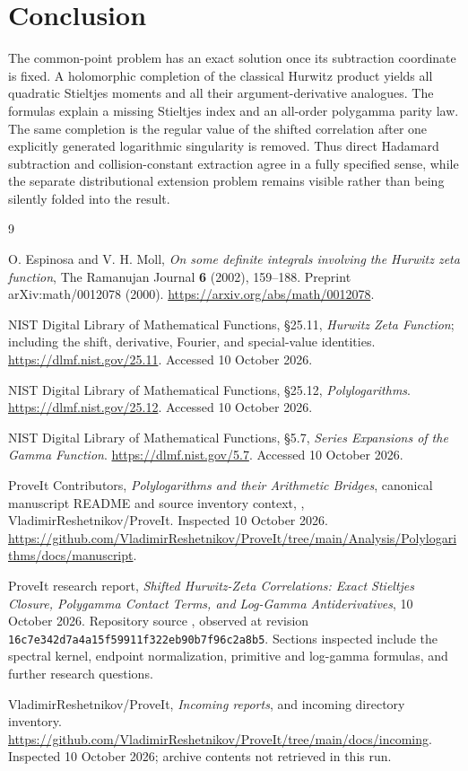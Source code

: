 \documentclass[11pt,a4paper]{article}
\numberwithin{equation}{section}
\theoremstyle{definition}
\newcommand{\cscpin}{\texttt{16c7e342d7a4a15f59911f322eb90b7f96c2a8b5}}
\begin{document}
\section*{Conclusion}
The common-point problem has an exact solution once its subtraction coordinate is fixed. A holomorphic completion of the classical Hurwitz product yields all quadratic Stieltjes moments and all their argument-derivative analogues. The formulas explain a missing Stieltjes index and an all-order polygamma parity law. The same completion is the regular value of the shifted correlation after one explicitly generated logarithmic singularity is removed. Thus direct Hadamard subtraction and collision-constant extraction agree in a fully specified sense, while the separate distributional extension problem remains visible rather than being silently folded into the result.

\begin{thebibliography}{9}
\raggedright
{}
O. Espinosa and V. H. Moll,
\emph{On some definite integrals involving the Hurwitz zeta function},
The Ramanujan Journal \textbf{6} (2002), 159--188.
Preprint arXiv:math/0012078 (2000).
\url{https://arxiv.org/abs/math/0012078}.

NIST Digital Library of Mathematical Functions,
\S25.11, \emph{Hurwitz Zeta Function}; including the shift, derivative, Fourier, and special-value identities.
\url{https://dlmf.nist.gov/25.11}. Accessed 10 October 2026.

NIST Digital Library of Mathematical Functions,
\S25.12, \emph{Polylogarithms}.
\url{https://dlmf.nist.gov/25.12}. Accessed 10 October 2026.

NIST Digital Library of Mathematical Functions,
\S5.7, \emph{Series Expansions of the Gamma Function}.
\url{https://dlmf.nist.gov/5.7}. Accessed 10 October 2026.

ProveIt Contributors,
\emph{Polylogarithms and their Arithmetic Bridges}, canonical manuscript README and source inventory context,
,
VladimirReshetnikov/ProveIt. Inspected 10 October 2026.
\url{https://github.com/VladimirReshetnikov/ProveIt/tree/main/Analysis/Polylogarithms/docs/manuscript}.

ProveIt research report,
\emph{Shifted Hurwitz-Zeta Correlations: Exact Stieltjes Closure, Polygamma Contact Terms, and Log-Gamma Antiderivatives}, 10 October 2026.
Repository source \allowbreak
{},
observed at revision \cscpin.
Sections inspected include the spectral kernel, endpoint normalization, primitive and log-gamma formulas, and further research questions.

VladimirReshetnikov/ProveIt,
\emph{Incoming reports},  and incoming directory inventory.
\url{https://github.com/VladimirReshetnikov/ProveIt/tree/main/docs/incoming}.
Inspected 10 October 2026; archive contents not retrieved in this run.
\end{thebibliography}
\end{document}

